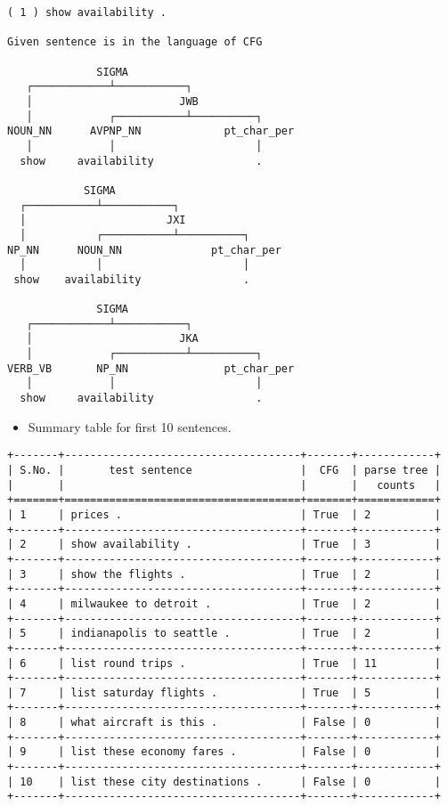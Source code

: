 \documentclass{article}[a4paper]
\begin{document}
\begin{Verbatim}
( 1 ) show availability .

Given sentence is in the language of CFG

              SIGMA
   ┌────────────┴───────────┐
   │                       JWB
   │            ┌───────────┴──────────┐
NOUN_NN      AVPNP_NN             pt_char_per
   │            │                      │
  show     availability                .

            SIGMA
  ┌───────────┴───────────┐
  │                      JXI
  │           ┌───────────┴──────────┐
NP_NN      NOUN_NN              pt_char_per
  │           │                      │
 show    availability                .

              SIGMA
   ┌────────────┴───────────┐
   │                       JKA
   │            ┌───────────┴──────────┐
VERB_VB       NP_NN               pt_char_per
   │            │                      │
  show     availability                .

\end{Verbatim}
\begin{itemize}
    \item Summary table for first 10 sentences.
\end{itemize}
\begin{Verbatim}
+-------+-------------------------------------+-------+------------+
| S.No. |       test sentence                 |  CFG  | parse tree |
|       |                                     |       |   counts   |
+=======+=====================================+=======+============+
| 1     | prices .                            | True  | 2          |
+-------+-------------------------------------+-------+------------+
| 2     | show availability .                 | True  | 3          |
+-------+-------------------------------------+-------+------------+
| 3     | show the flights .                  | True  | 2          |
+-------+-------------------------------------+-------+------------+
| 4     | milwaukee to detroit .              | True  | 2          |
+-------+-------------------------------------+-------+------------+
| 5     | indianapolis to seattle .           | True  | 2          |
+-------+-------------------------------------+-------+------------+
| 6     | list round trips .                  | True  | 11         |
+-------+-------------------------------------+-------+------------+
| 7     | list saturday flights .             | True  | 5          |
+-------+-------------------------------------+-------+------------+
| 8     | what aircraft is this .             | False | 0          |
+-------+-------------------------------------+-------+------------+
| 9     | list these economy fares .          | False | 0          |
+-------+-------------------------------------+-------+------------+
| 10    | list these city destinations .      | False | 0          |
+-------+-------------------------------------+-------+------------+
\end{Verbatim}


\end{document}
